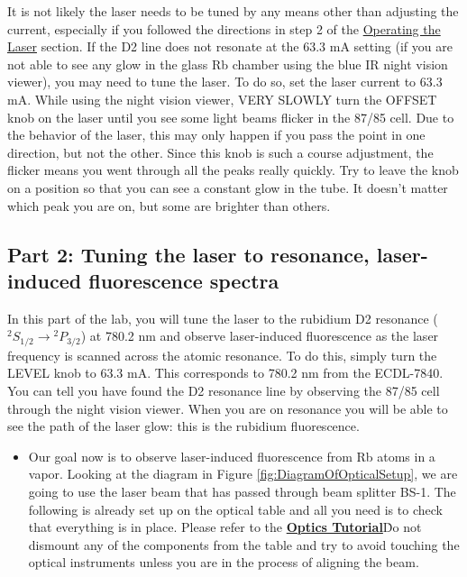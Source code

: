 \documentclass{../lab}
\begin{document}
It is not likely the laser needs to be tuned by any means other than adjusting the current, especially if you followed the directions in step 2 of the \hyperref[subsubsec:OperatingTheLaser]{Operating the Laser} section. If the D2 line does not resonate at the 63.3 mA setting (if you are not able to see any glow in the glass Rb chamber using the blue IR night vision viewer), you may need to tune the laser. To do so, set the laser current to 63.3 mA. While using the night vision viewer, VERY SLOWLY turn the OFFSET knob on the laser until you see some light beams flicker in the 87/85 cell. Due to the behavior of the laser, this may only happen if you pass the point in one direction, but not the other. Since this knob is such a course adjustment, the flicker means you went through all the peaks really quickly. Try to leave the knob on a position so that you can see a constant glow in the tube. It doesn't matter which peak you are on, but some are brighter than others.

\subsection{Part 2: Tuning the laser to resonance, laser-induced fluorescence spectra}

In this part of the lab, you will tune the laser to the rubidium D2 resonance ($^2S_{1/2} \rightarrow {}^2P_{3/2}$)  at 780.2 nm and observe laser-induced fluorescence as the laser frequency is scanned across the atomic resonance. To do this, simply turn the LEVEL knob to 63.3 mA. This corresponds to 780.2 nm from the ECDL-7840. You can tell you have found the D2 resonance line by observing the 87/85 cell through the night vision viewer. When you are on resonance you will be able to see the path of the laser glow: this is the rubidium fluorescence.

\begin{itemize}
    \item Our goal now is to observe laser-induced fluorescence from Rb atoms in a vapor. Looking at the diagram in Figure \ref{fig:DiagramOfOpticalSetup}, we are going to use the laser beam that has passed through beam splitter BS-1. The following is already set up on the optical table and all you need is to check that everything is in place. Please refer to the \href{http://experimentationlab.berkeley.edu/OpticsTutorial}{\textbf{Optics Tutorial}}\. Do not dismount any of the components from the table and try to avoid touching the optical instruments unless you are in the process of aligning the beam.

\end{itemize}
\end{document}
